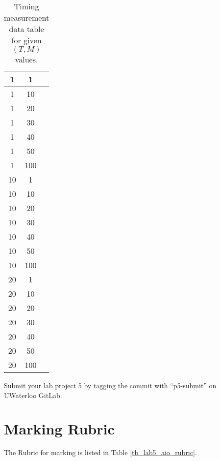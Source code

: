 \begin{enumerate}
\begin{table}[h]
\begin{center}
\begin{tabular}{|c|c|c|}
1 &    1 &    \\ \hline
1 &    10 &    \\ \hline
1 &    20 &    \\ \hline
1 &    30 &    \\ \hline
1 &    40 &    \\ \hline
1 &    50 &    \\ \hline
1 &    100 &    \\ \hline
10 &    1 &    \\ \hline
10 &    10 &    \\ \hline
10 &    20 &    \\ \hline
10 &    30 &    \\ \hline
10 &    40 &    \\ \hline
10 &    50 &    \\ \hline
10 &    100 &    \\ \hline
20 &    1 &    \\ \hline
20 &    10 &    \\ \hline
20 &    20 &    \\ \hline
20 &    30 &    \\ \hline
20 &    40 &    \\ \hline
20 &    50 &    \\ \hline
20 &    100 &    \\ \hline

\end{tabular}
\caption{Timing measurement data table for given $(T, M)$ values.}
\label{tb_timing_lab5}
\end{center}
\end{table}
\end{enumerate}
\iffalse
Use \verb+zip+ command to archive and compress the contents of lab5 directory and name it \verb+lab5.zip+. We expect the command \verb+unzip lab5.zip+ will produce a \verb+lab5+ sub-directory in the current working directory and under the \verb+lab5+ sub-directory we will find your source code, the Makefile and the lab5\_hostname.csv file.
\fi
Submit your lab project 5 by tagging the commit with ``p5-submit'' on UWaterloo GitLab.
\section{Marking Rubric}
The Rubric for marking is listed in Table \ref{tb_lab5_aio_rubric}.

